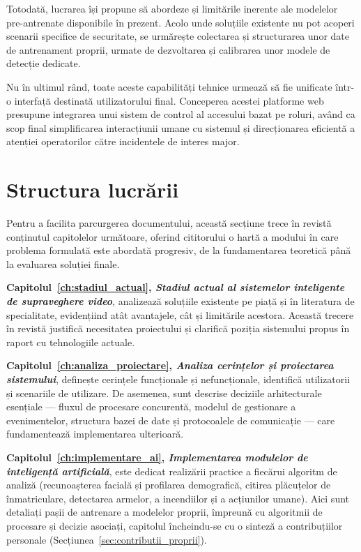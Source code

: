 \documentclass[../../main.tex]{subfiles}
\begin{document}
Totodată, lucrarea își propune să abordeze și limitările inerente ale modelelor pre-antrenate disponibile în prezent. Acolo unde soluțiile existente nu pot acoperi scenarii specifice de securitate, se urmărește colectarea și structurarea unor date de antrenament proprii, urmate de dezvoltarea și calibrarea unor modele de detecție dedicate.

Nu în ultimul rând, toate aceste capabilități tehnice urmează să fie unificate într-o interfață destinată utilizatorului final. Conceperea acestei platforme web presupune integrarea unui sistem de control al accesului bazat pe roluri, având ca scop final simplificarea interacțiunii umane cu sistemul și direcționarea eficientă a atenției operatorilor către incidentele de interes major.


\section{Structura lucrării}
\label{sec:structura}

Pentru a facilita parcurgerea documentului, această secțiune trece în revistă conținutul capitolelor următoare, oferind cititorului o hartă a modului în care problema formulată este abordată progresiv, de la fundamentarea teoretică până la evaluarea soluției finale.

\textbf{Capitolul~\ref{ch:stadiul_actual}, \emph{Stadiul actual al sistemelor inteligente de supraveghere video}}, analizează soluțiile existente pe piață și în literatura de specialitate, \linebreak evidențiind atât avantajele, cât și limitările acestora. Această trecere în revistă justifică necesitatea proiectului și clarifică poziția sistemului propus în raport cu tehnologiile actuale.

\textbf{Capitolul~\ref{ch:analiza_proiectare}, \emph{Analiza cerințelor și proiectarea sistemului}}, definește cerințele funcționale și nefuncționale, identifică utilizatorii și scenariile de utilizare. De asemenea, sunt descrise deciziile arhitecturale esențiale — fluxul de procesare concurentă, modelul de gestionare a evenimentelor, structura bazei de date și protocoalele de comunicație — care fundamentează implementarea ulterioară.

\textbf{Capitolul~\ref{ch:implementare_ai}, \emph{Implementarea modulelor de inteligență artificială}}, este dedicat realizării practice a fiecărui algoritm de analiză (recunoașterea facială și profilarea demografică, citirea plăcuțelor de înmatriculare, detectarea armelor, a incendiilor și a acțiunilor umane). Aici sunt detaliați pașii de antrenare a modelelor proprii, împreună cu algoritmii de procesare și decizie asociați, capitolul încheindu-se cu o sinteză a contribuțiilor personale (Secțiunea~\ref{sec:contributii_proprii}).
\end{document}
